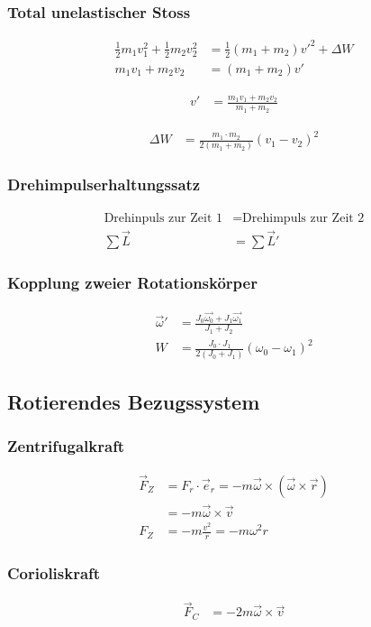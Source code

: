 \subsubsection*{Total unelastischer Stoss}
\begin{align*}
\frac{1}{2}m_1v_1^2+\frac{1}{2}m_2v_2^2&=\frac{1}{2}\left(m_1+m_2\right)v'^2+\Delta W\\
m_1v_1+m_2v_2&=\left(m_1+m_2\right)v'
\end{align*}

\begin{align*}
v'&=\frac{m_1v_1+m_2v_2}{m_1+m_2}
\end{align*}

\begin{align*}
\Delta W	&=\frac{m_1\cdot m_2}{2\left(m_1+m_2\right)}\left(v_1-v_2\right)^2
\end{align*}



\subsubsection*{Drehimpulserhaltungssatz}
\begin{align*}
\text{Drehinpuls zur Zeit 1} &= \text{Drehimpuls zur Zeit 2}\\
\sum \vec{L}&=\sum \vec{L}'
\end{align*}


\subsubsection*{Kopplung zweier Rotationskörper}
\begin{align*}
\vec{\omega}'&=\frac{J_0\vec{\omega_0}+J_1\vec{\omega_1}}{J_1+J_2}\\
W&=\frac{J_0\cdot J_1}{2\left(J_0+J_1\right)}\left(\omega_0-\omega_1\right)^2
\end{align*}


\subsection{Rotierendes Bezugssystem}

\begin{multicols}{2}{}
\subsubsection*{Zentrifugalkraft}
\begin{align*}
\vec{F}_Z&=F_r\cdot \vec{e}_r=-m\vec{\omega}\times\left(\vec{\omega}\times\vec{r}\right)\\
&=-m\vec{\omega}\times\vec{v}\\
F_Z&=-m\frac{v^2}{r}=-m\omega^2 r
\end{align*}


\subsubsection*{Corioliskraft}
\begin{align*}
\vec{F}_C&=-2m\vec{\omega}\times\vec{v}
\end{align*}
\vspace{10mm}
\end{multicols}

